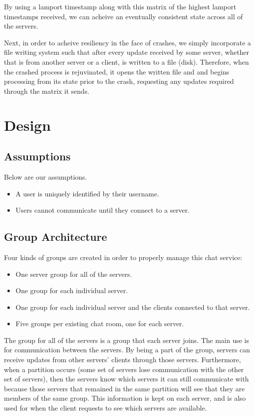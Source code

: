 \documentclass[12pt,journal,compsoc]{IEEEtran}
\begin{document}
By using a lamport timestamp along with this matrix of the highest lamport timestamps received, we can acheive an eventually consistent state across all of the servers.

Next, in order to acheive resiliency in the face of crashes, we simply incorporate a file writing system such that after every update received by some server, whether that is from another server or a client, is written to a file (disk). Therefore, when the crashed process is rejuvinated, it opens the written file and and begins processing from its state prior to the crash, requesting any updates required through the matrix it sends.

\section{Design}
\subsection{Assumptions}
Below are our assumptions.
\begin{itemize}
\item A user is uniquely identified by their username.
\item Users cannot communicate until they connect to a server.
\end{itemize}
\subsection{Group Architecture}
Four kinds of groups are created in order to properly manage this chat service:
\begin{itemize}
\item One server group for all of the servers.
\item One group for each individual server.
\item One group for each individual server and the clients connected to that server.
\item Five groups per existing chat room, one for each server.
\end{itemize}

The group for all of the servers is a group that each server joins. The main use is for communication between the servers. By being a part of the group, servers can receive updates from other servers' clients through those servers. Furthermore, when a partition occurs (some set of servers lose communication with the other set of servers), then the servers know which servers it can still communicate with because those servers that remained in the same partition will see that they are members of the same group.  This information is kept on each server, and is also used for when the client requests to see which servers are available.
\end{document}

